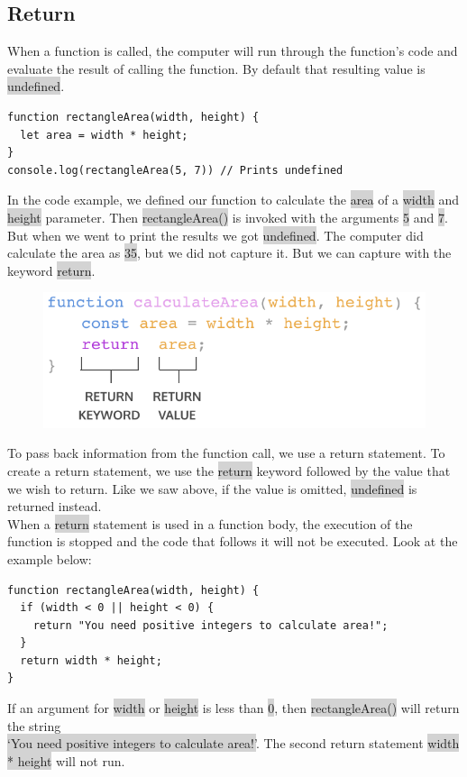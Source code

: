 \documentclass[11pt]{article}
\begin{document}
\subsection{Return}
When a function is called, the computer will run through the function’s code and evaluate the result of calling the function. By default that resulting value is \colorbox{lightgray}{undefined}. 
\begin{lstlisting}
function rectangleArea(width, height) {
  let area = width * height;
}
console.log(rectangleArea(5, 7)) // Prints undefined
\end{lstlisting}
In the code example, we defined our function to calculate the \colorbox{lightgray}{area} of a \colorbox{lightgray}{width} and \colorbox{lightgray}{height} parameter. Then \colorbox{lightgray}{rectangleArea()} is invoked with the arguments \colorbox{lightgray}{5} and \colorbox{lightgray}{7}. But when we went to print the results we got \colorbox{lightgray}{undefined}. The computer did calculate the area as \colorbox{lightgray}{35}, but we did not capture it. But we can capture with the keyword \colorbox{lightgray}{return}. 
\begin{figure}[H]
\includegraphics[scale = 0.73]{4_7}
\centering
\end{figure}
To pass back information from the function call, we use a return statement. To create a return statement, we use the \colorbox{lightgray}{return} keyword followed by the value that we wish to return. Like we saw above, if the value is omitted, \colorbox{lightgray}{undefined} is returned instead. \\
\newline
When a \colorbox{lightgray}{return} statement is used in a function body, the execution of the function is stopped and the code that follows it will not be executed. Look at the example below:
\begin{lstlisting}
function rectangleArea(width, height) {
  if (width < 0 || height < 0) {
    return "You need positive integers to calculate area!";
  }
  return width * height;
}
\end{lstlisting}
If an argument for \colorbox{lightgray}{width} or \colorbox{lightgray}{height} is less than \colorbox{lightgray}{0}, then \colorbox{lightgray}{rectangleArea()} will return the string \\ 
\colorbox{lightgray}{`You need positive integers to calculate area!'}. The second return statement \colorbox{lightgray}{width * height} will not run.
\end{document}
